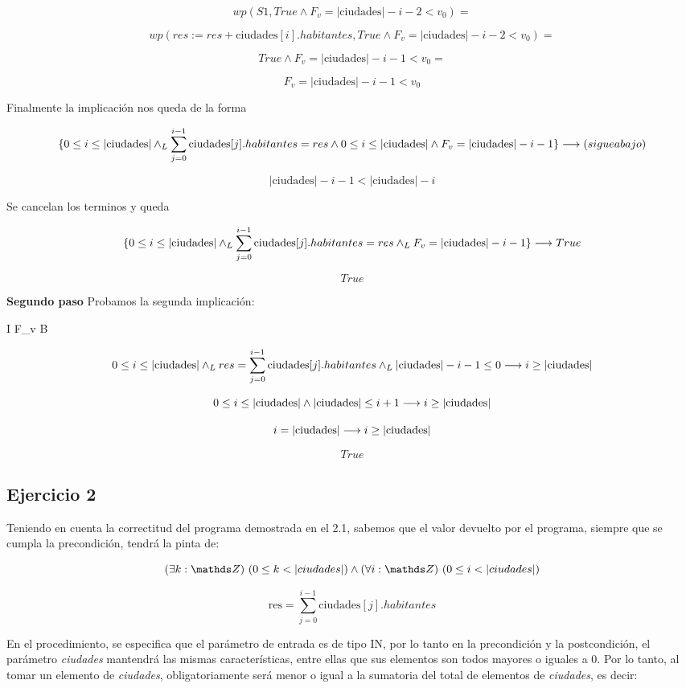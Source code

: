 \documentclass[10pt,a4paper]{article}
\begin{document}
\[
wp(S1, True \land F_v = |\text{ciudades}| - i - 2 < v_0) =
\]

\[
wp(res:= res + \text{ciudades}[i].habitantes, True \land F_v = |\text{ciudades}| - i - 2 < v_0) = 
\]

\[
True \land F_v = |\text{ciudades}| - i - 1 < v_0 =
\]

\[
F_v = |\text{ciudades}| - i - 1 < v_0
\]

Finalmente la implicación nos queda de la forma

\[
\{0 \leq i \leq |\text{ciudades}| \land _L \sum_{j=0}^{i-1} \text{ciudades}[j].habitantes = res \land 0 \leq i \leq |\text{ciudades}| \land F_v = |\text{ciudades}| - i - 1\} \longrightarrow (sigue abajo)
\]

\[
|\text{ciudades}| - i - 1 < |\text{ciudades}| - i 
\]

Se cancelan los terminos y queda

\[
\{0 \leq i \leq |\text{ciudades}| \land _L \sum_{j=0}^{i-1} \text{ciudades}[j].habitantes = res \land _L F_v = |\text{ciudades}| - i - 1 \} \longrightarrow True
\]

\[
True
\]

\textbf{Segundo paso} Probamos la segunda implicación:

I \land F_v  \implica \neg B

\[
0 \leq i \leq |\text{ciudades}| \land _L res = \sum_{j=0}^{i-1} \text{ciudades}[j].habitantes \land _L |\text{ciudades}| - i - 1 \leq 0 \longrightarrow i \geq |\text{ciudades}|
\]

\[
0 \leq i \leq |\text{ciudades}| \land |\text{ciudades}| \leq i + 1 \longrightarrow i \geq |\text{ciudades}|
\]

\[
i = |\text{ciudades}| \longrightarrow i \geq |\text{ciudades}|
\]

\[
True
\]

\subsection{Ejercicio 2}

Teniendo en cuenta la correctitud del programa demostrada en el 2.1, sabemos que el valor devuelto por el programa, siempre que se cumpla la precondición, tendrá la pinta de:

\[
\existe[unalinea]{k}{\ent}{0 \leq k < |ciudades|} \land \paraTodo[unalinea]{i}{\ent}{0 \leq i < |ciudades|}
\]

\[
\text{res} = \sum_{j=0}^{i-1} \text{ciudades}[j].habitantes 
\]

En el procedimiento, se especifica que el parámetro de entrada es de tipo IN, por lo tanto en la precondición y la postcondición, el parámetro \textit{ciudades} mantendrá las mismas características, entre ellas que sus elementos son todos mayores o iguales a 0. Por lo tanto, al tomar un elemento de \textit{ciudades}, obligatoriamente será menor o igual a la sumatoria del total de elementos de \textit{ciudades}, es decir:
\end{document}

